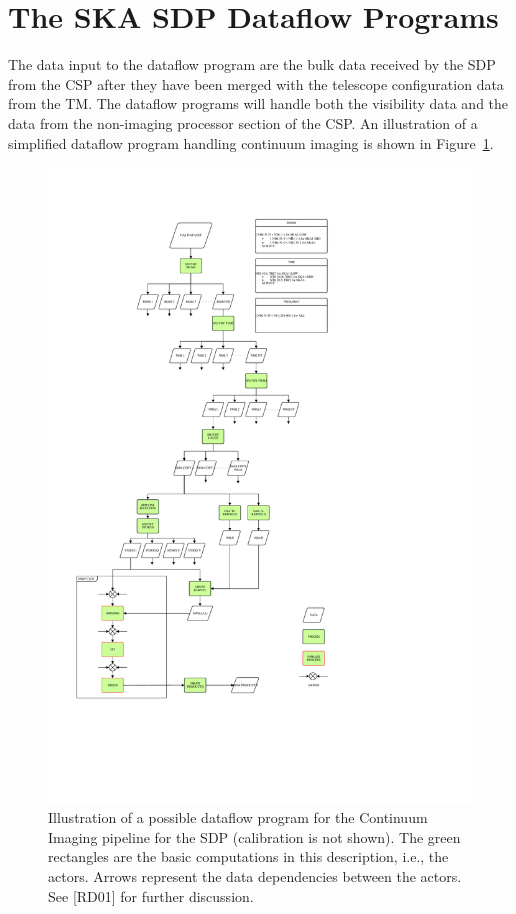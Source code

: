 \documentclass[11pt,a4paper]{article}
\begin{document}
\section{The SKA SDP Dataflow Programs}
\label{sec:ska-sdp-dataflow}

The data input to the dataflow program are the bulk data received by
the SDP from the CSP after they have been merged with the telescope
configuration data from the TM. The dataflow programs will handle both
the visibility data and the data from the non-imaging processor
section of the CSP. An illustration of a simplified dataflow program
handling continuum imaging is shown in Figure~\ref{fig:contdataflow}.


\begin{figure}
  \includegraphics[width=\textwidth,trim=0 4cm 0 0]{figs/dataflow/ContinuumImagingPipeline-Overview}
  \caption{Illustration of a possible dataflow program for the
    Continuum Imaging pipeline for the SDP (calibration is not
    shown). The green rectangles are the basic computations in this
    description, i.e., the actors. Arrows represent the data
    dependencies between the actors.  See [RD01] for further
    discussion.}
  \label{fig:contdataflow}
\end{figure}
\end{document}
